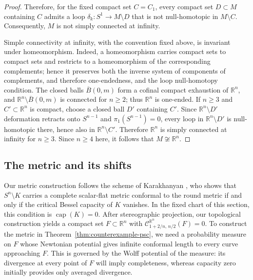\documentclass[12pt,oneside,a4paper]{article}
\theoremstyle{mytheorem}
\theoremstyle{remark}
\theoremstyle{definition}
\begin{document}
\begin{proof}
Therefore, for the fixed compact set $C=C_1$, every compact set
$D\subset M$ containing $C$ admits a loop
$\delta_k:S^1\to M\setminus D$ that is not null-homotopic in
$M\setminus C$.  Consequently, $M$ is not simply connected at infinity.

Simple connectivity at infinity, with the convention fixed above, is
invariant under homeomorphism.  Indeed, a homeomorphism carries compact
sets to compact sets and restricts to a homeomorphism of the corresponding
complements; hence it preserves both the inverse system of components of
complements, and therefore one-endedness, and the loop null-homotopy
condition.  The closed balls $\overline B(0,m)$ form a cofinal compact
exhaustion of $\mathbb R^n$, and
$\mathbb R^n\setminus\overline B(0,m)$ is connected for $n\geq2$; thus
$\mathbb R^n$ is one-ended.  If $n\geq3$ and
$C'\subset\mathbb R^n$ is compact, choose a closed ball $D'$ containing
$C'$.  Since $\mathbb R^n\setminus D'$ deformation retracts onto
$S^{n-1}$ and $\pi_1(S^{n-1})=0$, every loop in
$\mathbb R^n\setminus D'$ is null-homotopic there, hence also in
$\mathbb R^n\setminus C'$.  Therefore $\mathbb R^n$ is simply connected
at infinity for $n\geq3$.  Since $n\geq4$ here, it follows that
$M\not\cong\mathbb R^n$.
\end{proof}











\subsection{The metric and its shifts}


Our metric construction follows the scheme of Karakhanyan
\cite[Theorem~1.1]{zbMATH07873599}, who shows that $S^n\setminus K$ carries a
complete scalar-flat metric conformal to the round metric if and only
if the critical Bessel capacity of $K$ vanishes.  In the fixed chart of
this section, this condition is $\operatorname{cap}(K)=0$.  After
stereographic projection, our topological construction yields a
compact set $F\subset\mathbb R^n$ with
$\mathcal{C}_{1+2/n,\,n/2}^{\mathbb R^n}(F)=0$.  To construct the metric in
Theorem~\ref{thm:counterexample-psc}, we need a probability measure on $F$ whose
Newtonian potential gives infinite conformal length to every curve
approaching $F$.  This is governed by the Wolff potential of the
measure: its divergence at every point of $F$ will imply completeness,
whereas capacity zero initially provides only averaged divergence.
\end{document}
